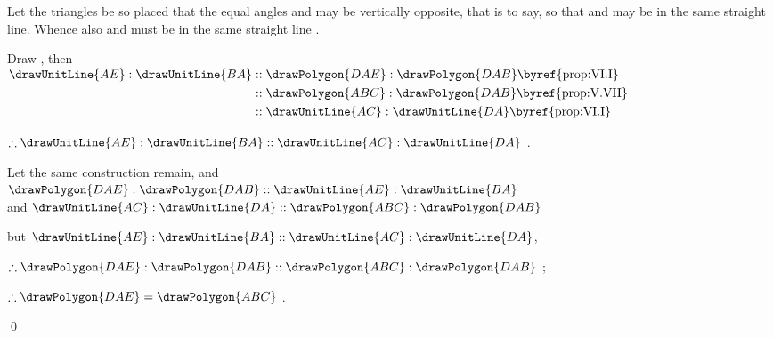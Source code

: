\documentclass[booklanguage=english]{byrnebook}
\begin{document}
Let the triangles be so placed that the equal angles  and  may be vertically opposite, that is to say, so that  and  may be in the same straight line. Whence also  and  must be in the same straight line .

\begin{center}
Draw , then\\
$\begin{aligned}
\drawUnitLine{AE} : \drawUnitLine{BA}
&:: \drawPolygon{DAE} : \drawPolygon{DAB} \mbox{\byref{prop:VI.I}}\\
&:: \drawPolygon{ABC} : \drawPolygon{DAB} \mbox{\byref{prop:V.VII}}\\
&:: \drawUnitLine{AC} : \drawUnitLine{DA} \mbox{\byref{prop:VI.I}}\\
\end{aligned}$

$\therefore \drawUnitLine{AE} : \drawUnitLine{BA} :: \drawUnitLine{AC} : \drawUnitLine{DA}$ .
\end{center}

\vfill\pagebreak

\begin{center}
Let the same construction remain, and\\
$\drawPolygon{DAE} : \drawPolygon{DAB} :: \drawUnitLine{AE} : \drawUnitLine{BA}$ \\
and $\drawUnitLine{AC} : \drawUnitLine{DA} :: \drawPolygon{ABC} : \drawPolygon{DAB}$ 

but $ \drawUnitLine{AE} : \drawUnitLine{BA} :: \drawUnitLine{AC} : \drawUnitLine{DA}$, \byref{\hypref}

$\therefore \drawPolygon{DAE} : \drawPolygon{DAB} :: \drawPolygon{ABC} : \drawPolygon{DAB}$ ;

$\therefore \drawPolygon{DAE} = \drawPolygon{ABC}$ .
\end{center}

\qed
\end{document}
